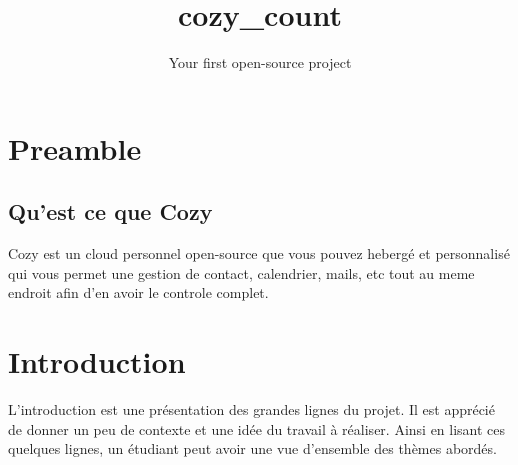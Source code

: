 \documentclass{42}
\begin{document}
                           \title{cozy\_count}
                          \subtitle{Your first open-source project}


\maketitle

\tableofcontents


\chapter{Preamble}

    \section{Qu'est ce que Cozy}
        Cozy est un cloud personnel open-source que vous pouvez heberg\'e et
        personnalis\'e qui vous permet une gestion de contact, calendrier, mails,
        etc tout au meme endroit afin d'en avoir le controle complet.


\chapter{Introduction}

    L'introduction est une pr\'esentation des grandes lignes du
    projet. Il est appr\'eci\'e de donner un peu de contexte et une
    id\'ee du travail \`a r\'ealiser. Ainsi en lisant ces quelques
    lignes, un \'etudiant peut avoir une vue d'ensemble des th\`emes
    abord\'es.\newline
\end{document}

